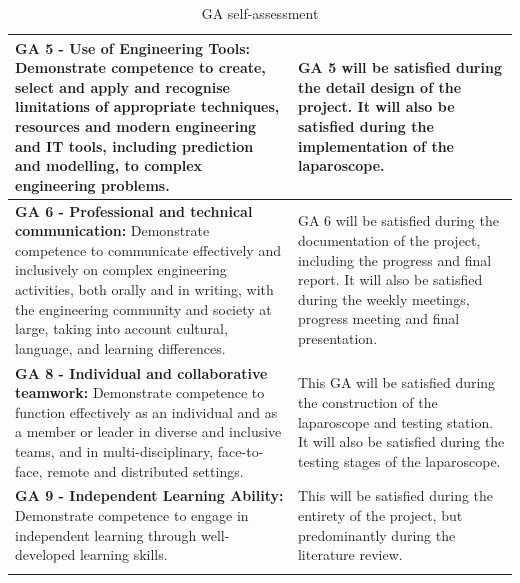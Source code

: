 \begin{longtable}{|p{}|p{}|}
\textbf{GA 5 - Use of Engineering Tools:} Demonstrate competence to create, select and apply and recognise limitations of appropriate techniques, resources and modern engineering and IT tools, including prediction and modelling, to complex engineering problems.
& 
GA 5 will be satisfied during the detail design of the project. It will also be satisfied during the implementation of the laparoscope. \\
\hline

\textbf{GA 6 - Professional and technical communication:} Demonstrate competence to communicate effectively and inclusively on complex engineering activities, both orally and in writing, with the engineering community and society at large, taking into account cultural, language, and learning differences.
& 
GA 6 will be satisfied during the documentation of the project, including the progress and final report. It will also be satisfied during the weekly meetings, progress meeting and final presentation. \\
\hline

\textbf{GA 8 - Individual and collaborative teamwork:} Demonstrate competence to function effectively as an individual and as a member or leader in diverse and inclusive teams, and in multi-disciplinary, face-to-face, remote and distributed settings.
& 
This GA will be satisfied during the construction of the laparoscope and testing station. It will also be satisfied during the testing stages of the laparoscope. \\
\hline

\textbf{GA 9 - Independent Learning Ability:} Demonstrate competence to engage in independent learning through well-developed learning skills.
& 
This will be satisfied during the entirety of the project, but predominantly during the literature review. \\
\hline

\caption{GA self-assessment}

\label{tab:longtable}
\end{longtable}